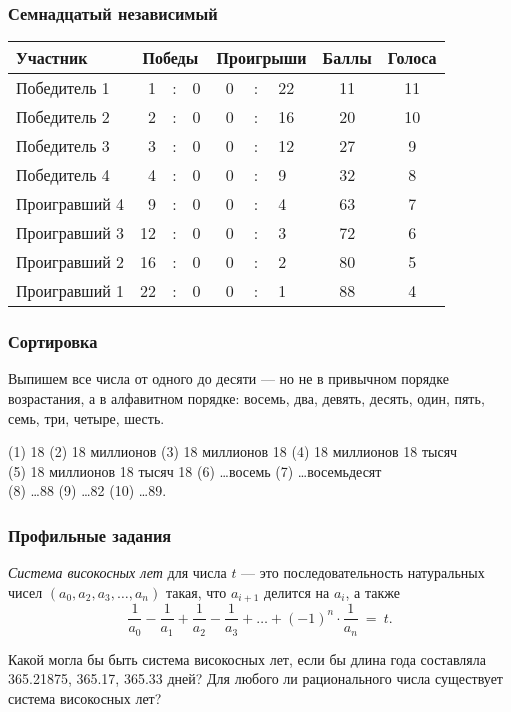\documentclass[aspectratio=1610,12pt,notheorems]{beamer}
\begin{document}
\begin{frame} \frametitle{Семнадцатый независимый}

\newcommand{\vs}{&\hspace{-3mm}:&\hspace{-3mm}}
\begin{center} \begin{tabular}{|l|rcl|rcl|c|c|}
	\hline
	Участник & \multicolumn{3}{c|}{Победы}
		& \multicolumn{3}{c|}{Проигрыши}
		& Баллы & Голоса \\ \hline \hline
	Победитель 1 & 1 \vs 0 & 0 \vs 22 & 11 & 11 \\ \hline
	Победитель 2 & 2 \vs 0 & 0 \vs 16 & 20 & 10 \\ \hline
	Победитель 3 & 3 \vs 0 & 0 \vs 12 & 27 & 9 \\ \hline
	Победитель 4 & 4 \vs 0 & 0 \vs 9 & 32 & 8 \\ \hline \hline
	Проигравший 4 & 9 \vs 0 & 0 \vs 4 & 63 & 7 \\ \hline
	Проигравший 3 & 12 \vs 0 & 0 \vs 3 & 72 & 6 \\ \hline
	Проигравший 2 & 16 \vs 0 & 0 \vs 2 & 80 & 5 \\ \hline
	Проигравший 1 & 22 \vs 0 & 0 \vs 1 & 88 & 4 \\ \hline
\end{tabular} \end{center}

\end{frame}


\begin{frame} \frametitle{Сортировка}
Выпишем все числа от одного до десяти — но не в привычном порядке возрастания, а в алфавитном порядке: восемь, два, девять, десять, один, пять, семь, три, четыре, шесть. \medskip


(1) 18 (2) 18 миллионов (3) 18 миллионов 18 (4) 18 миллионов 18 тысяч \\
(5) 18 миллионов 18 тысяч 18 (6) \ldots восемь (7) \ldots восемьдесят \\
(8) \ldots 88 (9) \ldots 82 (10) \ldots 89.
\end{frame}


\begin{frame} \frametitle{Профильные задания}
{\it Система високосных лет} для числа $t$ — это последовательность натуральных чисел $(a_0, a_2, a_3, \ldots, a_n)$ такая, что $a_{i+1}$ делится на $a_i$, а также
	$$\frac{1}{a_0} - \frac{1}{a_1} + \frac{1}{a_2} - \frac{1}{a_3} + \ldots
	     + (-1)^{n} \cdot \frac{1}{a_n}\ =\ t.$$ \smallskip

Какой могла бы быть система високосных лет, если бы длина года составляла 365.21875, 365.17, 365.33 дней? Для любого ли рационального числа существует система високосных лет?
\end{frame}
\end{document}
